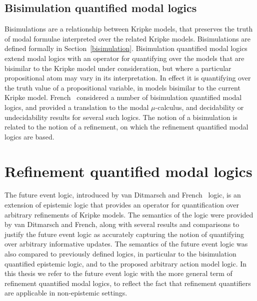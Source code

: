 \subsection{Bisimulation quantified modal logics}

Bisimulations are a relationship between Kripke models, that preserves the truth
of modal formulae interpreted over the related Kripke models. Bisimulations are
defined formally in Section~\ref{bisimulation}. Bisimulation quantified modal
logics extend modal logics with an operator for quantifying over the models that
are bisimilar to the Kripke model under consideration, but where a particular
propositional atom may vary in its interpretation. In effect it is quantifying
over the truth value of a propositional variable, in models bisimilar to the
current Kripke model.  French~\cite{french2006bisimulation} considered a number
of bisimulation quantified modal logics, and provided a translation to the
modal $\mu$-calculus, and decidability or undecidability results for several
such logics. The notion of a bisimulation is related to the notion of a
refinement, on which the refinement quantified modal logics are based.

\section{Refinement quantified modal logics}

The future event logic, introduced by van Ditmarsch and
French~\cite{french2009simulation} logic, is an extension of epistemic logic
that provides an operator for quantification over arbitrary refinements of
Kripke models. The semantics of the logic were provided by van Ditmarsch and
French, along with several results and comparisons to justify the future event
logic as accurately capturing the notion of quantifying over arbitrary
informative updates. The semantics of the future event logic was also compared
to previously defined logics, in particular to the bisimulation quantified
epistemic logic, and to the proposed arbitrary action model logic.  In this
thesis we refer to the future event logic with the more general term of
refinement quantified modal logics, to reflect the fact that refinement
quantifiers are applicable in non-epistemic settings.

